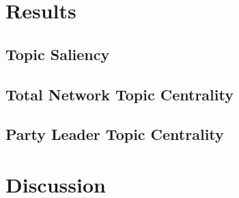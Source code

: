 \documentclass{nws}
\begin{document}
\section{Results}

\subsection{Topic Saliency}

\subsection{Total Network Topic Centrality}

\subsection{Party Leader Topic Centrality}

\section{Discussion}




\label{lastpage}
\end{document}
